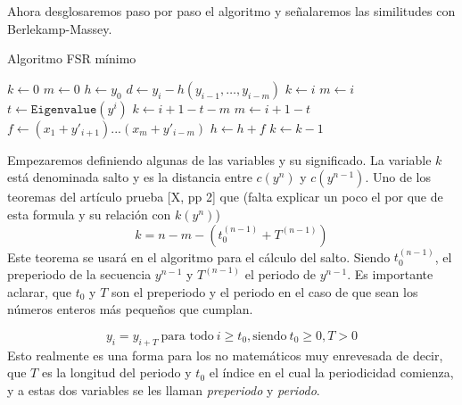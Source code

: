\newpage
Ahora desglosaremos paso por paso el algoritmo y señalaremos las similitudes con Berlekamp-Massey.

\begin{algorithm}
\caption{Algoritmo FSR mínimo}\label{alg:three}
$k \gets 0$\;
$m \gets 0$\;
$h \gets y_0$\;
 {
    $d \gets y_i - h(y_{i-1},\dots,y_{i-m})$\;
     {
     {
        $k \gets i$\;
        $m \gets i$\;
    }
     {
        $t \gets \texttt{Eigenvalue$(y^{i})$}$\;
         {
            $k \gets i + 1 - t - m$\;
            $m \gets i + 1 - t$\;
        }
    }
    $f \gets (x_{1} + y'_{i+1})...(x_m+y'_{i-m})$\;
    $h \gets h + f$\;
    }
    $k \gets k - 1$\;
}
\end{algorithm}
\newpage
Empezaremos definiendo algunas de las variables y su significado. La variable $k$ está denominada salto y es la distancia entre $c(y^{n})$ y $c(y^{n-1})$. Uno de los teoremas del artículo prueba [X, pp 2] que (falta explicar un poco el por que de esta formula y su relación con $k(y^n)$)
\[k = n - m - (t^{(n-1)}_0 + T^{(n - 1)})\]
Este teorema se usará en el algoritmo para el cálculo del salto. Siendo $t_0^{(n - 1)}$, el preperiodo de la secuencia $y^{n-1}$ y $T^{(n - 1)}$ el periodo de $y^{n-1}$. Es importante aclarar, que $t_0$ y $T$ son el preperiodo y el periodo en el caso de que sean los números enteros más pequeños que cumplan.

\[y_i = y_{i+T} \ \text{para todo} \ i \geq t_0, \text{siendo} \  t_0 \geq 0, T > 0\]
Esto realmente es una forma para los no matemáticos muy enrevesada de decir, que $T$ es la longitud del periodo y $t_0$ el índice en el cual la periodicidad comienza, y a estas dos variables se les llaman \textit{preperiodo} y \textit{periodo}. \\\\

